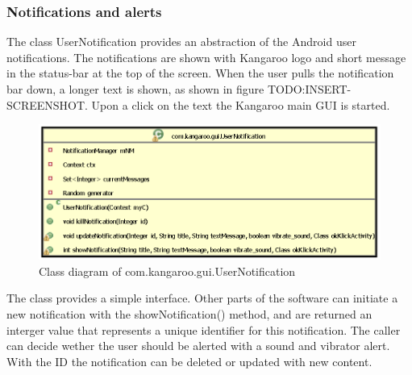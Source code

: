 \subsubsection{Notifications and alerts} %
The class UserNotification provides an abstraction of the Android user notifications. The notifications are shown with Kangaroo logo and short message in the status-bar at the top of the screen. When the user pulls the notification bar down, a longer text is shown, as shown in figure TODO:INSERT-SCREENSHOT. Upon a click on the text the Kangaroo main GUI is started.
\begin{figure}[h!]
\centering
\includegraphics[width=14cm]{pics/notifications.png}
\caption{Class diagram of com.kangaroo.gui.UserNotification}
\label{android_structure}
\end{figure}
The class provides a simple interface. Other parts of the software can initiate a new notification with the showNotification() method, and are returned an interger value that represents a unique identifier for this notification. The caller can decide wether the user should be alerted with a sound and vibrator alert. With the ID the notification can be deleted or updated with new content.
